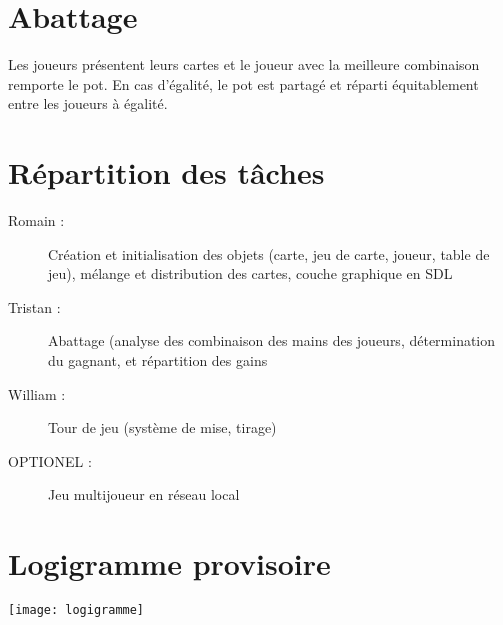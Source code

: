 \documentclass[12pt,a4paper]{article}
\begin{document}
\section{Abattage}
Les joueurs présentent leurs cartes et le joueur avec la meilleure combinaison remporte le pot. En cas d'égalité, le pot est partagé et réparti équitablement entre les joueurs à égalité.
\section{Répartition des tâches}
\begin{description}
\item[Romain : ]{Création et initialisation des objets (carte, jeu de carte, joueur, table de jeu), mélange et distribution des cartes, couche graphique en SDL}
\item[Tristan : ]{Abattage (analyse des combinaison des mains des joueurs, détermination du gagnant, et répartition des gains}
\item[William :]  {Tour de jeu (système de mise, tirage)}
\item[OPTIONEL : ]{Jeu multijoueur en réseau local}
\end{description}

\section{Logigramme provisoire}
\texttt{[image: logigramme]}
\end{document}
